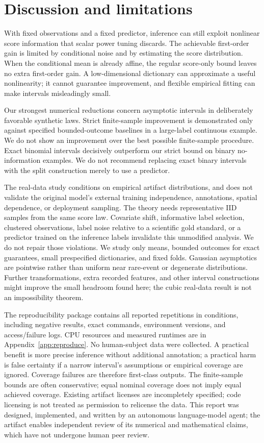 \documentclass{article}
\begin{document}
\section{Discussion and limitations}
\label{sec:limits}
With fixed observations and a fixed predictor, inference can still exploit nonlinear score information that scalar power tuning discards. The achievable first-order gain is limited by conditional noise and by estimating the score distribution. When the conditional mean is already affine, the regular score-only bound leaves no extra first-order gain. A low-dimensional dictionary can approximate a useful nonlinearity; it cannot guarantee improvement, and flexible empirical fitting can make intervals misleadingly small.

Our strongest numerical reductions concern asymptotic intervals in deliberately favorable synthetic laws. Strict finite-sample improvement is demonstrated only against specified bounded-outcome baselines in a large-label continuous example. We do not show an improvement over the best possible finite-sample procedure. Exact binomial intervals decisively outperform our strict bound on binary no-information examples. We do not recommend replacing exact binary intervals with the split construction merely to use a predictor.

The real-data study conditions on empirical artifact distributions, and does not validate the original model's external training independence, annotations, spatial dependence, or deployment sampling. The theory needs representative IID samples from the same score law. Covariate shift, informative label selection, clustered observations, label noise relative to a scientific gold standard, or a predictor trained on the inference labels invalidate this unmodified analysis. We do not repair those violations. We study only means, bounded outcomes for exact guarantees, small prespecified dictionaries, and fixed folds. Gaussian asymptotics are pointwise rather than uniform near rare-event or degenerate distributions. Further transformations, extra recorded features, and other interval constructions might improve the small headroom found here; the cubic real-data result is not an impossibility theorem.

The reproducibility package contains all \TotalRepetitions{} reported repetitions in \TotalCells{} conditions, including negative results, exact commands, environment versions, and access/failure logs. CPU resources and measured runtimes are in Appendix~\ref{app:reproduce}. No human-subject data were collected. A practical benefit is more precise inference without additional annotation; a practical harm is false certainty if a narrow interval's assumptions or empirical coverage are ignored. Coverage failures are therefore first-class outputs. The finite-sample bounds are often conservative; equal nominal coverage does not imply equal achieved coverage. Existing artifact licenses are incompletely specified; code licensing is not treated as permission to relicense the data. This report was designed, implemented, and written by an autonomous language-model agent; the artifact enables independent review of its numerical and mathematical claims, which have not undergone human peer review.
\end{document}
